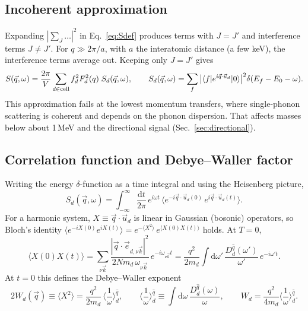\documentclass[11pt,a4paper]{article}
\numberwithin{equation}{section}
\newcommand{\qv}{\vec q}
\newcommand{\ket}[1]{|#1\rangle}
\newcommand{\bra}[1]{\langle #1|}
\newcommand{\qh}{\hat q}
\newcommand{\dd}{\mathrm{d}}
\newcommand{\avg}[1]{\langle #1\rangle}
\begin{document}
\subsection{Incoherent approximation}
\label{sec:incoherent}
Expanding $|\sum_J\ldots|^2$ in Eq.~\eqref{eq:Sdef} produces terms with $J=J'$ and
interference terms $J\neq J'$. For $q\gg 2\pi/a$, with $a$ the interatomic distance
(a few keV), the interference terms average out. Keeping only $J=J'$ gives
\begin{equation}
  S(\qv,\omega) = \frac{2\pi}{V}\sum_{d\in{\rm cell}} f_d^2 F_d^2(q)\; S_d(\qv,\omega),
  \qquad
  S_d(\qv,\omega)=\sum_f\big|\bra f e^{i\qv\cdot\vec u_d}\ket 0\big|^2
  \delta(E_f-E_0-\omega).
  \label{eq:Sincoh}
\end{equation}
This approximation fails at the lowest momentum transfers, where single-phonon scattering is
coherent and depends on the phonon dispersion. That affects masses below about 1\,MeV and
the directional signal (Sec.~\ref{sec:directional}).

\subsection{Correlation function and Debye--Waller factor}
Writing the energy $\delta$-function as a time integral and using the Heisenberg picture,
\begin{equation}
  S_d(\qv,\omega)=\int_{-\infty}^{\infty}\frac{\dd t}{2\pi}\,e^{i\omega t}\,
  \big\langle e^{-i\qv\cdot\vec u_d(0)}\,e^{i\qv\cdot\vec u_d(t)}\big\rangle .
\end{equation}
For a harmonic system, $X\equiv\qv\cdot\vec u_d$ is linear in Gaussian (bosonic) operators,
so Bloch's identity
$\avg{e^{-iX(0)}e^{iX(t)}}=e^{-\avg{X^2}}\,e^{\avg{X(0)X(t)}}$ holds. At $T=0$,
\begin{equation}
  \avg{X(0)X(t)} = \sum_{\nu\vec k}\frac{|\qv\cdot\vec e_{d,\nu\vec k}|^2}
  {2N m_d\,\omega_{\nu\vec k}}\,e^{-i\omega_{\nu\vec k}t}
  = \frac{q^2}{2m_d}\int\dd\omega'\,\frac{D_d^{\qh}(\omega')}{\omega'}\,e^{-i\omega' t}.
  \label{eq:XX}
\end{equation}
At $t=0$ this defines the Debye--Waller exponent
\begin{equation}
  2W_d(\qv)\equiv\avg{X^2}=\frac{q^2}{2m_d}\,\avg{\frac1\omega}_{\!d}^{\qh},
  \qquad
  \avg{\frac1\omega}_{\!d}^{\qh}\equiv\int\dd\omega\,\frac{D_d^{\qh}(\omega)}{\omega},
  \qquad
  W_d=\frac{q^2}{4m_d}\avg{\frac1\omega}_{\!d}^{\qh}.
\end{equation}
\end{document}
